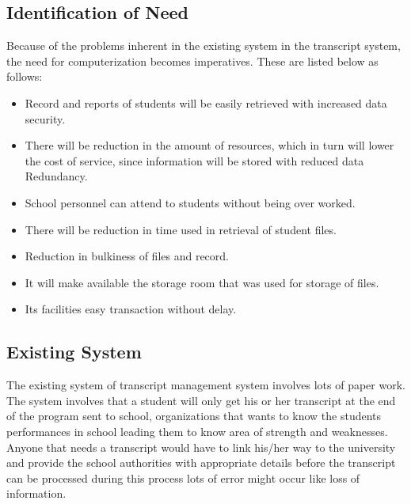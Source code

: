 \subsection{Identification of Need}
Because of the problems inherent in the existing system in the transcript system, the need for computerization becomes imperatives. These are listed below as follows:
\begin{itemize}
    \item Record and reports of students will be easily retrieved with increased data security.
    \item There will be reduction in the amount of resources, which in turn will lower the cost of service, since information will be stored with reduced data Redundancy.
    \item School personnel can attend to students without being over worked.
    \item There will be reduction in time used in retrieval of student files.
    \item Reduction in bulkiness of files and record.
    \item It will make available the storage room that was used for storage of files.
    \item Its facilities easy transaction without delay.
\end{itemize}

\subsection{Existing System}
The existing system of transcript management system involves lots of paper work. The system involves that a student will only get his or her transcript at the end of the program sent to school, organizations that wants to know the students performances in school leading them to know area of strength and weaknesses. Anyone that needs a transcript would have to link his/her way to the university and provide the school authorities with appropriate details before the transcript can be processed during this process lots of error might occur like loss of information.


